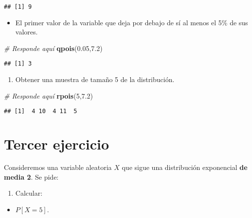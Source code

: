 \documentclass[
]{article}
\newenvironment{Shaded}{\begin{snugshade}}{\end{snugshade}}
\newcommand{\CommentTok}[1]{\textcolor[rgb]{0.56,0.35,0.01}{\textit{#1}}}
\newcommand{\DecValTok}[1]{\textcolor[rgb]{0.00,0.00,0.81}{#1}}
\newcommand{\FloatTok}[1]{\textcolor[rgb]{0.00,0.00,0.81}{#1}}
\newcommand{\KeywordTok}[1]{\textcolor[rgb]{0.13,0.29,0.53}{\textbf{#1}}}
\newcommand{\NormalTok}[1]{#1}
\providecommand{\tightlist}{%
  \setlength{\itemsep}{0pt}\setlength{\parskip}{0pt}}
\begin{document}
\begin{verbatim}
## [1] 9
\end{verbatim}

\begin{itemize}
\tightlist
\item
  El primer valor de la variable que deja por debajo de sí al menos el
  5\% de sus valores.
\end{itemize}

\begin{Shaded}
\begin{Highlighting}[]
\CommentTok{# Responde aquí}
\KeywordTok{qpois}\NormalTok{(}\FloatTok{0.05}\NormalTok{,}\FloatTok{7.2}\NormalTok{)}
\end{Highlighting}
\end{Shaded}

\begin{verbatim}
## [1] 3
\end{verbatim}

\begin{enumerate}
\def\labelenumi{\arabic{enumi}.}
\setcounter{enumi}{2}
\tightlist
\item
  Obtener una muestra de tamaño 5 de la distribución.
\end{enumerate}

\begin{Shaded}
\begin{Highlighting}[]
\CommentTok{# Responde aquí}
\KeywordTok{rpois}\NormalTok{(}\DecValTok{5}\NormalTok{,}\FloatTok{7.2}\NormalTok{)}
\end{Highlighting}
\end{Shaded}

\begin{verbatim}
## [1]  4 10  4 11  5
\end{verbatim}

\hypertarget{tercer-ejercicio}{%
\section{Tercer ejercicio}\label{tercer-ejercicio}}

Consideremos una variable aleatoria \(X\) que sigue una distribución
exponencial \textbf{de media 2}. Se pide:

\begin{enumerate}
\def\labelenumi{\arabic{enumi}.}
\tightlist
\item
  Calcular:
\end{enumerate}

\begin{itemize}
\tightlist
\item
  \(P [X = 5]\).
\end{itemize}
\end{document}
